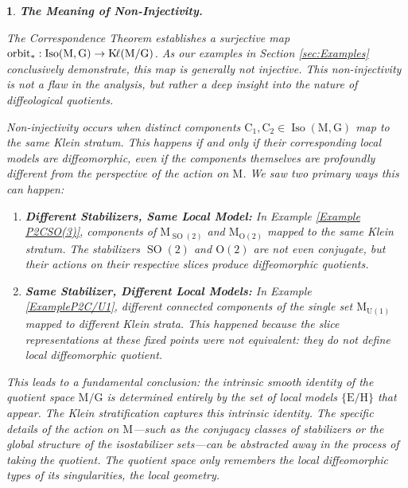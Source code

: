 \documentclass[10pt,reqno,letterpaper,twoside]{amsart}
\theoremstyle{article}
\newtheorem{article}{}
\def\artlabel[#1]{\textbf{#1.}}
\def \C{\mathrm C}
\def \E{\mathrm E}
\def \G{\mathrm G}
\def \H{\mathrm H}
\def \K{\mathrm K}
\def \M{\mathrm M}
\def \O{\mathrm O}
\def \U{\mathrm U}
\DeclareMathOperator{\Iso}{Iso}
\DeclareMathOperator{\Kl}{{\K\hspace{-1pt}\ell}}
\DeclareMathOperator{\SO}{SO}
\newcommand{\orbit}{{\mathrm{orbit}}}
\def \H{\mathrm H} %
\def \O{\mathrm O}
\begin{document}
  
  \begin{article}
    \artlabel[The Meaning of Non-Injectivity]
    \label{Non-Injectivity_of_the_Map}
    
    The Correspondence Theorem establishes a surjective map $\orbit_* : \Iso(\M,\G) \to \Kl(\M/\G)$.
    As our examples in Section \ref{sec:Examples} conclusively demonstrate,
    this map is generally not injective.
    This non-injectivity is not a flaw in the analysis,
    but rather a deep insight into the nature of diffeological quotients.
    
    Non-injectivity occurs when distinct components $\C_1, \C_2 \in \Iso(\M,\G)$ map to the same Klein stratum.
    This happens if and only if their corresponding local models are diffeomorphic,
    even if the components themselves are profoundly different from the perspective of the action on $\M$.
    We saw two primary ways this can happen:
    
    \begin{enumerate}
      \item \textbf{Different Stabilizers, Same Local Model:} In Example \ref{Example P2CSO(3)},
      components of $\M_{\SO(2)}$ and $\M_{\O(2)}$ mapped to the same Klein stratum.
      The stabilizers $\SO(2)$ and $\O(2)$ are not even conjugate,
      but their actions on their respective slices produce diffeomorphic quotients.
      \item \textbf{Same Stabilizer, Different Local Models:} In Example \ref{ExampleP2C/U1},
      different connected components of the single set $\M_{\U(1)}$ mapped to \emph{different} Klein strata.
      This happened because the slice representations at these fixed points were not equivalent:
      they do not define local diffeomorphic quotient.
    \end{enumerate}
    
    This leads to a fundamental conclusion:
    the intrinsic smooth identity of the quotient space $\M/\G$ is determined entirely by the set of local models $\{\E/\H\}$ that appear.
    The Klein stratification captures this intrinsic identity.
    The specific details of the action on $\M$—such as the conjugacy classes of stabilizers or the global structure of the isostabilizer sets—can be abstracted away in the process of taking the quotient.
    The quotient space only remembers the local diffeomorphic types of its singularities,
    the local geometry.
    
  \end{article}
  
\end{document}

